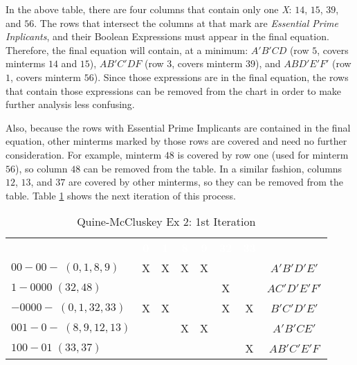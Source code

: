 In the above table, there are four columns that contain only one \emph{X}: $ 14 $, $ 15 $, $ 39 $, and $ 56 $. The rows that intersect the columns at that mark are \emph{Essential Prime Inplicants}, and their Boolean Expressions must appear in the final equation. Therefore, the final equation will contain, at a minimum: $ A'B'CD $ (row $ 5 $, covers minterms $ 14 $ and $ 15 $), $ AB'C'DF $ (row $ 3 $, covers minterm $ 39 $), and $ ABD'E'F' $ (row $ 1 $, covers minterm $ 56 $). Since those expressions are in the final equation, the rows that contain those expressions can be removed from the chart in order to make further analysis less confusing. 

Also, because the rows with Essential Prime Implicants are contained in the final equation, other minterms marked by those rows are covered and need no further consideration. For example, minterm $ 48 $ is covered by row one (used for minterm $ 56 $), so column $ 48 $ can be removed from the table. In a similar fashion, columns $ 12 $, $ 13 $, and $ 37 $ are covered by other minterms, so they can be removed from the table. Table \ref{ASM:tab:qm_ex_2_1st_iteration} shows the next iteration of this process.

\begin{table}[H]
	\sffamily
	\newcommand{\head}[1]{\textcolor{white}{\textbf{#1}}}		
	\begin{center}
		\begin{adjustbox}{max width=\textwidth}
			\begin{tabular}{lccccccc} 
				\rowcolor{black!75}
				& \head{0} & \head{1} & \head{8} & \head{9}
				& \head{32} & \head{33} & \\
				$ 00-00-\;(0,1,8,9) $     & X & X & X & X &   &   & $ A'B'D'E' $ \\
				$ 1-0000\;(32,48) $       &   &   &   &   & X &   & $ AC'D'E'F' $ \\
				$ -0000-\;(0,1,32,33) $   & X & X &   &   & X & X & $ B'C'D'E' $ \\
				$ 001-0-\;(8,9,12,13) $   &   &   & X & X &   &   & $ A'B'CE' $ \\
				$ 100-01\;(33,37) $       &   &   &   &   &   & X & $ AB'C'E'F $ \\
				\hline
			\end{tabular}
		\end{adjustbox}
	\end{center}
	\caption{Quine-McCluskey Ex 2: 1st Iteration}
  \label{ASM:tab:qm_ex_2_1st_iteration}
\end{table}


